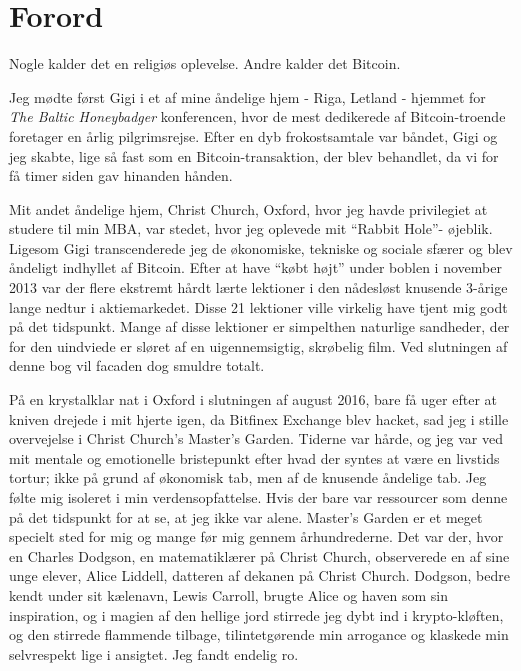 \chapter*{Forord}

Nogle kalder det en religiøs oplevelse. Andre kalder det Bitcoin.

Jeg mødte først Gigi i et af mine åndelige hjem - Riga, Letland - hjemmet for
\textit{The Baltic Honeybadger} konferencen, hvor de mest dedikerede af
Bitcoin-troende foretager en årlig pilgrimsrejse. Efter en dyb frokostsamtale
var båndet, Gigi og jeg skabte, lige så fast som en Bitcoin-transaktion, der
blev behandlet, da vi for få timer siden gav hinanden hånden.

Mit andet åndelige hjem, Christ Church, Oxford, hvor jeg havde privilegiet at
studere til min MBA, var stedet, hvor jeg oplevede mit \enquote{Rabbit Hole}-
øjeblik. Ligesom Gigi transcenderede jeg de økonomiske, tekniske og sociale 
sfærer og blev åndeligt indhyllet af Bitcoin. Efter at have \enquote{købt højt} 
under boblen i november 2013 var der flere ekstremt hårdt lærte lektioner i den 
nådesløst knusende 3-årige lange nedtur i aktiemarkedet. 
Disse 21 lektioner ville virkelig have tjent mig godt på det tidspunkt. Mange af 
disse lektioner er simpelthen naturlige sandheder, der for den uindviede er 
sløret af en uigennemsigtig, skrøbelig film. Ved slutningen af denne bog vil 
facaden dog smuldre totalt.

På en krystalklar nat i Oxford i slutningen af august 2016, bare få uger efter
at kniven drejede i mit hjerte igen, da Bitfinex Exchange blev hacket, sad jeg
i stille overvejelse i Christ Church's Master's Garden. Tiderne var hårde, og
jeg var ved mit mentale og emotionelle bristepunkt efter hvad der syntes at være 
en livstids tortur; ikke på grund af økonomisk tab, men af de knusende åndelige
tab. Jeg følte mig isoleret i min verdensopfattelse. Hvis der bare var
ressourcer som denne på det tidspunkt for at se, at jeg ikke var alene. Master's
Garden er et meget specielt sted for mig og mange før mig gennem
århundrederne. Det var der, hvor en Charles Dodgson, en matematiklærer på Christ
Church, observerede en af sine unge elever, Alice Liddell, datteren af
dekanen på Christ Church. Dodgson, bedre kendt under sit kælenavn, Lewis 
Carroll, brugte Alice og haven som sin inspiration, og i magien af den hellige
jord stirrede jeg dybt ind i krypto-kløften, og den stirrede flammende tilbage,
tilintetgørende min arrogance og klaskede min selvrespekt lige i ansigtet. Jeg 
fandt endelig ro.

